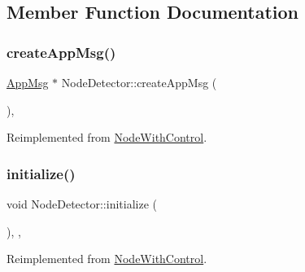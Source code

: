 \subsection{Member Function Documentation}
\mbox{\label{classNodeDetector_a7100349647350ad5e3aeb1ed4669c723}} 
\subsubsection{\texorpdfstring{create\+App\+Msg()}{createAppMsg()}}
{\footnotesize\ttfamily \hyperlink{classAppMsg}{App\+Msg} $\ast$ Node\+Detector\+::create\+App\+Msg (\begin{DoxyParamCaption}{ }\end{DoxyParamCaption})\hspace{0.3cm}{\ttfamily [protected]}, {\ttfamily [virtual]}}



Reimplemented from \hyperlink{classNodeWithControl_a7772568c2836f5f204952ebe659e0049}{Node\+With\+Control}.

\mbox{\label{classNodeDetector_aefa188ab0657837b1b57f24674d3ef22}} 
\subsubsection{\texorpdfstring{initialize()}{initialize()}}
{\footnotesize\ttfamily void Node\+Detector\+::initialize (\begin{DoxyParamCaption}{ }\end{DoxyParamCaption})\hspace{0.3cm}{\ttfamily [override]}, {\ttfamily [protected]}, {\ttfamily [virtual]}}



Reimplemented from \hyperlink{classNodeWithControl_a08c8e80fd67b52c51c642d7c66fe729c}{Node\+With\+Control}.

\mbox{\label{classNodeDetector_a17ecf9939fce7471f4513b66185743cc}} 
